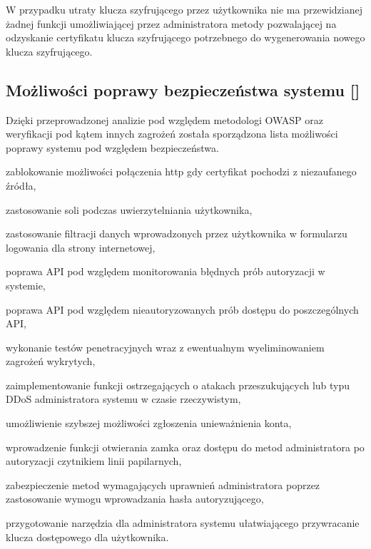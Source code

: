  W przypadku utraty klucza szyfrującego przez użytkownika nie ma przewidzianej żadnej funkcji umożliwiającej przez administratora metody pozwalającej na odzyskanie certyfikatu klucza szyfrującego potrzebnego do wygenerowania nowego klucza szyfrującego.
 
\subsection{Możliwości poprawy bezpieczeństwa systemu [\StudentA]}

Dzięki przeprowadzonej analizie pod względem metodologi OWASP oraz weryfikacji pod kątem innych zagrożeń została sporządzona lista możliwości poprawy systemu pod względem bezpieczeństwa. 
\begin{itemize*}
	\item zablokowanie możliwości połączenia http gdy certyfikat pochodzi z niezaufanego źródła,
	\item zastosowanie soli podczas uwierzytelniania użytkownika,
	\item  zastosowanie filtracji danych wprowadzonych przez użytkownika w formularzu logowania dla strony internetowej,
	\item poprawa API pod względem monitorowania błędnych prób autoryzacji w systemie,
	\item  poprawa API pod względem nieautoryzowanych prób dostępu do poszczególnych API,
	\item wykonanie testów penetracyjnych wraz z ewentualnym wyeliminowaniem zagrożeń wykrytych,
	\item zaimplementowanie funkcji ostrzegających o atakach przeszukujących lub typu DDoS administratora systemu w czasie rzeczywistym,
	\item umożliwienie szybszej możliwości zgłoszenia unieważnienia konta, 
	\item wprowadzenie funkcji otwierania zamka oraz dostępu do metod administratora po autoryzacji czytnikiem linii papilarnych,
	\item zabezpieczenie metod wymagających uprawnień administratora poprzez zastosowanie wymogu wprowadzania hasła autoryzującego,
	\item przygotowanie narzędzia dla administratora systemu ułatwiającego przywracanie klucza dostępowego dla użytkownika. 
\end{itemize*}

 
